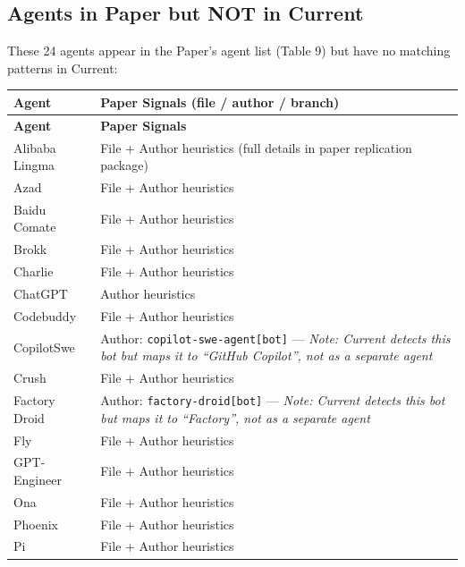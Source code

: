 \documentclass[10pt,a4paper]{article}
\begin{document}
\subsection{Agents in Paper but NOT in Current}

These 24 agents appear in the Paper's agent list (Table 9) but have no matching patterns in Current:

\begin{longtable}{L{3.2cm}L{10.3cm}}
\toprule
\textbf{Agent} & \textbf{Paper Signals (file / author / branch)} \\
\midrule\endfirsthead
\toprule\textbf{Agent}&\textbf{Paper Signals}\\\midrule\endhead\bottomrule\endlastfoot

Alibaba Lingma   & File + Author heuristics (full details in paper replication package) \\
Azad             & File + Author heuristics \\
Baidu Comate     & File + Author heuristics \\
Brokk            & File + Author heuristics \\
Charlie          & File + Author heuristics \\
ChatGPT          & Author heuristics \\
Codebuddy        & File + Author heuristics \\
CopilotSwe       & Author: \texttt{copilot-swe-agent[bot]} — \emph{Note: Current detects this bot but maps it to ``GitHub Copilot'', not as a separate agent} \\
Crush            & File + Author heuristics \\
Factory Droid    & Author: \texttt{factory-droid[bot]} — \emph{Note: Current detects this bot but maps it to ``Factory'', not as a separate agent} \\
Fly              & File + Author heuristics \\
GPT-Engineer     & File + Author heuristics \\
Ona              & File + Author heuristics \\
Phoenix          & File + Author heuristics \\
Pi               & File + Author heuristics \\

\end{longtable}
\end{document}
